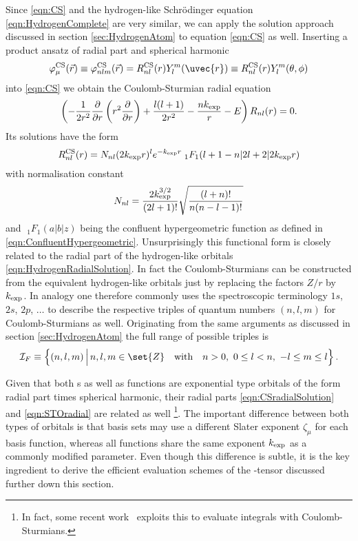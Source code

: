 Since \eqref{eqn:CS} and the hydrogen-like Schrödinger equation
\eqref{eqn:HydrogenComplete} are very similar,
we can apply the solution approach discussed in section \vref{sec:HydrogenAtom}
to equation \eqref{eqn:CS} as well.
Inserting a product ansatz of radial part and spherical harmonic
\begin{equation}
	\varphi^\text{CS}_\mu(\vec{r}) \equiv
	\varphi^\text{CS}_{nlm}(\vec{r}) = R^{\text{CS}}_{nl}(r) Y_l^m(\uvec{r})
	\equiv
	R^{\text{CS}}_{nl}(r) Y_l^m(\theta, \phi)
	\label{eqn:CSproduct}
\end{equation}
into \eqref{eqn:CS} we obtain the Coulomb-Sturmian radial equation
\begin{equation}
	\left( - \frac{1}{2r^2} \frac{\partial}{\partial r} \left( r^2 \frac{\partial}{\partial r} \right) + \frac{l (l+1)}{2 r^2}
	- \frac{nk_\text{exp}}{r} - E \right) R_{nl}(r) = 0.
	\label{eqn:CSRadial}
\end{equation}
Its solutions have the form
\begin{equation}
	R^\text{CS}_{nl}(r) = N_{nl} (2k_\text{exp} r)^l e^{-k_\text{exp} r}
	\;_1F_1\!\left(l+1-n \middle| 2l+2 \middle|2k_\text{exp} r\right)
	\label{eqn:CSradialSolution}
\end{equation}
with normalisation constant
\[ N_{nl} = \frac{2 k_\text{exp}^{3/2}}{(2l+1)!} \sqrt{ \frac{(l+n)!}{n (n-l-1)!}} \]
and $\;_1F_1\!\left(a|b|z\right)$ being the confluent hypergeometric function
as defined in \eqref{eqn:ConfluentHypergeometric}.
Unsurprisingly this functional form is closely related to the radial part of the
hydrogen-like orbitals \eqref{eqn:HydrogenRadialSolution}.
In fact the Coulomb-Sturmians can be constructed
from the equivalent hydrogen-like orbitals
just by replacing the factors $Z/r$ by $k_\text{exp}$.
In analogy one therefore commonly uses the spectroscopic terminology
$1s$, $2s$, $2p$, $\ldots$
to describe the respective triples
of quantum numbers $(n, l, m)$ for Coulomb-Sturmians as well.
Originating from the same arguments as discussed in section \ref{sec:HydrogenAtom}
the full range of possible triples is
\begin{equation}
	\Itpf \equiv \left\{ (n, l, m) \, \Big| \, n,l,m \in \set{Z}
		\quad \text{with} \quad
		n > 0, \  0 \leq l < n,\  -l \leq m \leq l\right\}.
	\label{eqn:AllCSTriples}
\end{equation}

Given that both {\STO}s as well as \CS functions are exponential type orbitals
of the form radial part times spherical harmonic,
their radial parts \eqref{eqn:CSradialSolution} and \eqref{eqn:STOradial}
are related as well%
\footnote{In fact, some recent work~\cite{Avery2017} exploits this to evaluate
\STO \ERI integrals with Coulomb-Sturmians.}.
The important difference between both types of orbitals is
that {\STO} basis sets may use a different Slater exponent $\zeta_\mu$ for each
\STO basis function,
whereas all \CS functions share the same exponent $k_\text{exp}$
as a commonly modified parameter.
Even though this difference is subtle,
it is the key ingredient to derive the efficient evaluation schemes
of the \CS-\ERI tensor discussed further down this section.

